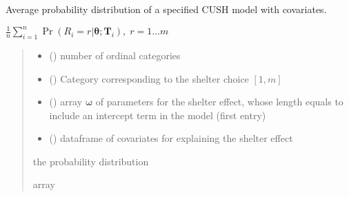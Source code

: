 \documentclass[letterpaper,10pt,english]{sphinxmanual}
\begin{document}
\begin{fulllineitems}
\label{\detokenize{cubmods:cubmods.cush_x.pmf}}
\pysigstartsignatures
{}
\pysigstopsignatures
\sphinxAtStartPar
Average probability distribution of a specified CUSH model with covariates.

\sphinxAtStartPar
\(\frac{1}{n} \sum_{i=1}^n \Pr(R_i=r|\pmb\theta; \pmb T_i),\; r=1 \ldots m\)
\begin{quote}\begin{description}
\begin{itemize}
\item {} 
\sphinxAtStartPar
{} () \textendash{} number of ordinal categories

\item {} 
\sphinxAtStartPar
{} () \textendash{} Category corresponding to the shelter choice \([1,m]\)

\item {} 
\sphinxAtStartPar
{} () \textendash{} array \(\pmb \omega\) of parameters for the shelter effect, whose length equals 
 to include an intercept term in the model (first entry)

\item {} 
\sphinxAtStartPar
{} () \textendash{} dataframe of covariates for explaining the shelter effect

\end{itemize}

\sphinxAtStartPar
the probability distribution

\sphinxAtStartPar
array

\end{description}\end{quote}

\end{fulllineitems}
\end{document}
